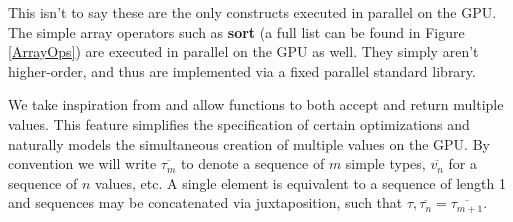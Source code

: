 \documentclass[preprint]{sigplanconf}
\begin{document}
This isn't to say these are the only constructs executed in parallel on the
GPU. The simple array operators such as \textbf{sort} (a full list can be found
in Figure \ref{ArrayOps}) are executed in parallel on the GPU as well. They
simply aren't higher-order, and thus are implemented via a fixed parallel
standard library.

We take inspiration from \cite{Bol09} and allow functions to both accept and
return multiple values. This feature simplifies the specification of certain
optimizations and naturally models the simultaneous creation of multiple values
on the GPU. By convention we will write $\overline{\tau_m}$ to denote a sequence
of $m$ simple types, $\overline{v_n}$ for a sequence  of $n$ values, etc. A
single element is equivalent to a sequence of length 1 and sequences may be
concatenated via juxtaposition, such that $\tau, \overline{\tau_n} =
\overline{\tau_{m+1}}$.
\end{document}
